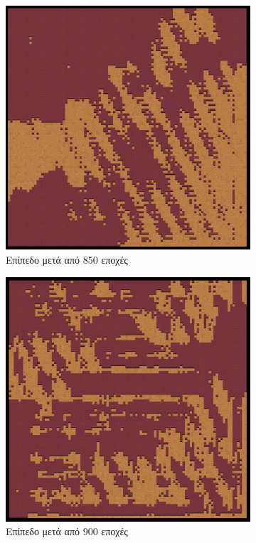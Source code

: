 \begin{figure}[H]
\begin{subfigure}{.5\textwidth}
  \centering
  \includegraphics[width=.8\linewidth]{../images/generated/850.png}
  \caption{Επίπεδο μετά από 850 εποχές}
  \label{fig:sfig1}
\end{subfigure}%
\begin{subfigure}{.5\textwidth}
  \centering
  \includegraphics[width=.8\linewidth]{../images/generated/900.png}
  \caption{Επίπεδο μετά από 900 εποχές}
  \label{fig:sfig2}
\end{subfigure}
\begin{subfigure}{.5\textwidth}

\end{subfigure}
\end{figure}
